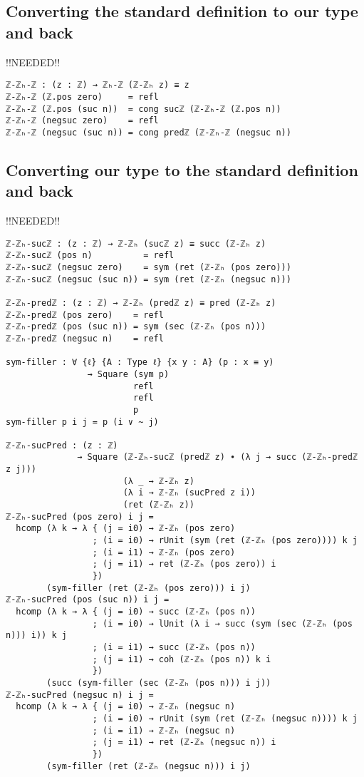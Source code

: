 \subsection{Converting the standard definition to our type and back}
!!NEEDED!!
\begin{verbatim}
ℤ-ℤₕ-ℤ : (z : ℤ) → ℤₕ-ℤ (ℤ-ℤₕ z) ≡ z
ℤ-ℤₕ-ℤ (ℤ.pos zero)     = refl
ℤ-ℤₕ-ℤ (ℤ.pos (suc n))  = cong sucℤ (ℤ-ℤₕ-ℤ (ℤ.pos n))
ℤ-ℤₕ-ℤ (negsuc zero)    = refl
ℤ-ℤₕ-ℤ (negsuc (suc n)) = cong predℤ (ℤ-ℤₕ-ℤ (negsuc n))
\end{verbatim}

\subsection{Converting our type to the standard definition and back}
!!NEEDED!!
\begin{verbatim}
ℤ-ℤₕ-sucℤ : (z : ℤ) → ℤ-ℤₕ (sucℤ z) ≡ succ (ℤ-ℤₕ z)
ℤ-ℤₕ-sucℤ (pos n)          = refl
ℤ-ℤₕ-sucℤ (negsuc zero)    = sym (ret (ℤ-ℤₕ (pos zero)))
ℤ-ℤₕ-sucℤ (negsuc (suc n)) = sym (ret (ℤ-ℤₕ (negsuc n)))

ℤ-ℤₕ-predℤ : (z : ℤ) → ℤ-ℤₕ (predℤ z) ≡ pred (ℤ-ℤₕ z)
ℤ-ℤₕ-predℤ (pos zero)    = refl
ℤ-ℤₕ-predℤ (pos (suc n)) = sym (sec (ℤ-ℤₕ (pos n)))
ℤ-ℤₕ-predℤ (negsuc n)    = refl

sym-filler : ∀ {ℓ} {A : Type ℓ} {x y : A} (p : x ≡ y)
                → Square (sym p)
                         refl
                         refl
                         p
sym-filler p i j = p (i ∨ ~ j)

ℤ-ℤₕ-sucPred : (z : ℤ)
              → Square (ℤ-ℤₕ-sucℤ (predℤ z) ∙ (λ j → succ (ℤ-ℤₕ-predℤ z j)))
                       (λ _ → ℤ-ℤₕ z)
                       (λ i → ℤ-ℤₕ (sucPred z i))
                       (ret (ℤ-ℤₕ z))
ℤ-ℤₕ-sucPred (pos zero) i j =
  hcomp (λ k → λ { (j = i0) → ℤ-ℤₕ (pos zero)
                 ; (i = i0) → rUnit (sym (ret (ℤ-ℤₕ (pos zero)))) k j
                 ; (i = i1) → ℤ-ℤₕ (pos zero)
                 ; (j = i1) → ret (ℤ-ℤₕ (pos zero)) i
                 })
        (sym-filler (ret (ℤ-ℤₕ (pos zero))) i j)
ℤ-ℤₕ-sucPred (pos (suc n)) i j =
  hcomp (λ k → λ { (j = i0) → succ (ℤ-ℤₕ (pos n))
                 ; (i = i0) → lUnit (λ i → succ (sym (sec (ℤ-ℤₕ (pos n))) i)) k j
                 ; (i = i1) → succ (ℤ-ℤₕ (pos n))
                 ; (j = i1) → coh (ℤ-ℤₕ (pos n)) k i
                 })
        (succ (sym-filler (sec (ℤ-ℤₕ (pos n))) i j))
ℤ-ℤₕ-sucPred (negsuc n) i j =
  hcomp (λ k → λ { (j = i0) → ℤ-ℤₕ (negsuc n)
                 ; (i = i0) → rUnit (sym (ret (ℤ-ℤₕ (negsuc n)))) k j
                 ; (i = i1) → ℤ-ℤₕ (negsuc n)
                 ; (j = i1) → ret (ℤ-ℤₕ (negsuc n)) i
                 })
        (sym-filler (ret (ℤ-ℤₕ (negsuc n))) i j)


\end{verbatim}
